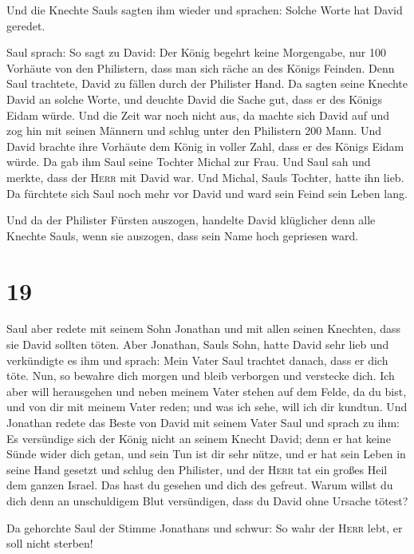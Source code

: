  Und die Knechte Sauls sagten ihm wieder und sprachen:
Solche Worte hat David geredet.

 Saul sprach: So sagt zu David: Der König begehrt keine
Morgengabe, nur 100 Vorhäute von den Philistern, dass man sich räche an
des Königs Feinden. Denn Saul trachtete, David zu fällen durch der
Philister Hand.  Da sagten seine Knechte David an solche
Worte, und deuchte David die Sache gut, dass er des Königs Eidam würde.
Und die Zeit war noch nicht aus,  da machte sich David
auf und zog hin mit seinen Männern und schlug unter den Philistern 200
Mann. Und David brachte ihre Vorhäute dem König in voller Zahl, dass er
des Königs Eidam würde. Da gab ihm Saul seine Tochter Michal zur Frau.
 Und Saul sah und merkte, dass der \textsc{Herr} mit
David war. Und Michal, Sauls Tochter, hatte ihn lieb.  Da
fürchtete sich Saul noch mehr vor David und ward sein Feind sein Leben
lang.

 Und da der Philister Fürsten auszogen, handelte David
klüglicher denn alle Knechte Sauls, wenn sie auszogen, dass sein Name
hoch gepriesen ward.

\hypertarget{section-18}{%
\section{19}\label{section-18}}

 Saul aber redete mit seinem Sohn Jonathan und mit allen
seinen Knechten, dass sie David sollten töten. Aber Jonathan, Sauls
Sohn, hatte David sehr lieb  und verkündigte es ihm und
sprach: Mein Vater Saul trachtet danach, dass er dich töte. Nun, so
bewahre dich morgen und bleib verborgen und verstecke dich.
 Ich aber will herausgehen und neben meinem Vater stehen
auf dem Felde, da du bist, und von dir mit meinem Vater reden; und was
ich sehe, will ich dir kundtun.  Und Jonathan redete das
Beste von David mit seinem Vater Saul und sprach zu ihm: Es versündige
sich der König nicht an seinem Knecht David; denn er hat keine Sünde
wider dich getan, und sein Tun ist dir sehr nütze,  und er
hat sein Leben in seine Hand gesetzt und schlug den Philister, und der
\textsc{Herr} tat ein großes Heil dem ganzen Israel. Das hast du gesehen
und dich des gefreut. Warum willst du dich denn an unschuldigem Blut
versündigen, dass du David ohne Ursache tötest?

 Da gehorchte Saul der Stimme Jonathans und schwur: So
wahr der \textsc{Herr} lebt, er soll nicht sterben!

